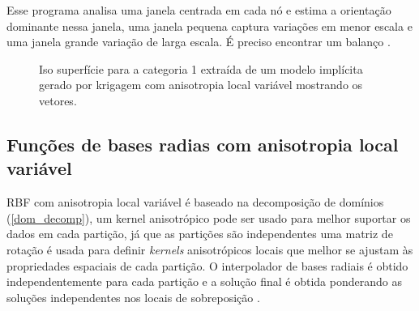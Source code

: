 Esse programa analisa uma janela centrada em cada nó e estima a orientação dominante nessa janela, uma janela pequena captura variações em menor escala e uma janela grande variação de larga escala. É preciso encontrar um balanço \cite{lillah2015inference}.

\begin{figure} 
\caption{Iso superfície para a categoria 1 extraída de um modelo implícita gerado por krigagem com anisotropia local variável mostrando os vetores.} \label{lva_krig}
     \centering
\end{figure}

\subsection{Funções de bases radias com anisotropia local variável}

RBF com anisotropia local variável é baseado na decomposição de domínios (\autoref{dom_decomp}), um kernel anisotrópico pode ser usado para melhor suportar os dados em cada partição, já que as partições são independentes uma matriz de rotação é usada para definir \textit{kernels} anisotrópicos locais que melhor se ajustam às propriedades espaciais de cada partição. O interpolador de bases radiais é obtido independentemente para cada partição e a solução final é obtida ponderando as soluções independentes nos locais de sobreposição \cite{martin2017implicitmodeling}.

